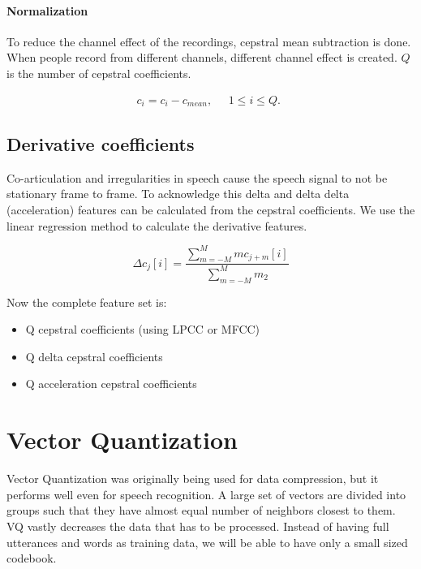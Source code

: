 \subsubsection{Normalization}

To reduce the channel effect of the recordings, cepstral mean subtraction is done. When people record from different channels, different channel effect is created. $Q$ is the number of cepstral coefficients.

\begin{equation*}
    c_i = c_i - c_{mean},
    \quad \begin{aligned} 1 \leq i \leq Q. \end{aligned}
\end{equation*}

\section{Derivative coefficients}

Co-articulation and irregularities in speech cause the speech signal to not be stationary frame to frame. To acknowledge this delta and delta delta (acceleration) features can be calculated from the cepstral coefficients.
We use the linear regression method to calculate the derivative features.

\begin{equation*}
    \Delta c_j[i] = \frac{\sum_{m=-M}^{M} m c_{j+m}[i]}{\sum_{m=-M}^{M} m_2 }
\end{equation*}

Now the complete feature set is:
{\begin{itemize}
\item Q cepstral coefficients (using LPCC or MFCC)
\item Q delta cepstral coefficients
\item Q acceleration cepstral coefficients    
\end{itemize}}

\chapter{Vector Quantization}

Vector Quantization was originally being used for data compression, but it performs well even for speech recognition. A large set of vectors are divided into groups such that they have almost equal number of neighbors closest to them. VQ vastly decreases the data that has to be processed. Instead of having full utterances and words as training data, we will be able to have only a small sized codebook.

